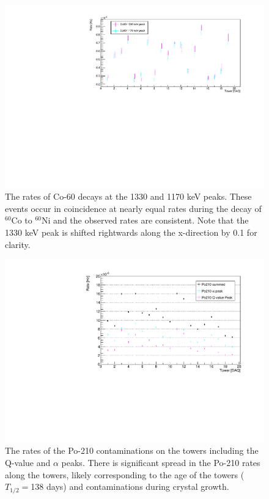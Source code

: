 \begin{figure}
    \centering
    \includegraphics[width=0.8\linewidth]{Figures/Co60_combined.pdf}
    \caption[The rates of Co-60 decays at the 1330 and 1170 keV peaks.]
    {The rates of Co-60 decays at the 1330 and 1170 keV peaks.
    These events occur in coincidence at nearly equal rates during the decay of $^{60}$Co to $^{60}$Ni and the observed rates are consistent.
    Note that the 1330 keV peak is shifted rightwards along the x-direction by 0.1 for clarity.}
    \label{fig:Co60_towers}
\end{figure}

\begin{figure}
    \centering
    \includegraphics[width=0.8\linewidth]{Figures/Po210AllTowers.pdf}
    \caption[The rates of the Po-210 contaminations on the towers including the Q-value and $\alpha$ peaks.]
    {The rates of the Po-210 contaminations on the towers including the Q-value and $\alpha$ peaks.
    There is significant spread in the Po-210 rates along the towers, likely corresponding to the age of the towers ($T_{1/2}=$138 days) and contaminations during crystal growth.}
    \label{fig:po210_towers}
\end{figure}

